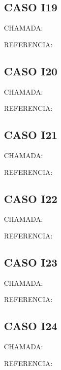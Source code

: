 \documentclass{undftex}
\begin{document}
\begin{refsection}\section*{CASO I19}\noindent CHAMADA:  \par\noindent REFERENCIA:\par\printbibliography[heading=none]\end{refsection}\clearpage
\begin{refsection}\section*{CASO I20}\noindent CHAMADA:  \par\noindent REFERENCIA:\par\printbibliography[heading=none]\end{refsection}\clearpage
\begin{refsection}\section*{CASO I21}\noindent CHAMADA:  \par\noindent REFERENCIA:\par\printbibliography[heading=none]\end{refsection}\clearpage
\begin{refsection}\section*{CASO I22}\noindent CHAMADA:  \par\noindent REFERENCIA:\par\printbibliography[heading=none]\end{refsection}\clearpage
\begin{refsection}\section*{CASO I23}\noindent CHAMADA:  \par\noindent REFERENCIA:\par\printbibliography[heading=none]\end{refsection}\clearpage
\begin{refsection}\section*{CASO I24}\noindent CHAMADA:  \par\noindent REFERENCIA:\par\printbibliography[heading=none]\end{refsection}\clearpage
\end{document}
